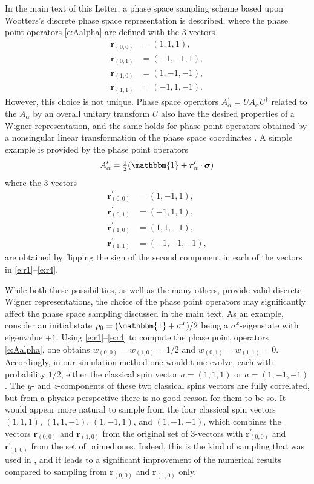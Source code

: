 \documentclass[aps,prl,showpacs,amsmath,amssymb,superscriptaddress,reprint,10pt]{revtex4-1}
\newcommand\id{{\mathbbm{1}}}
\newcommand{\mvec}[1]{\boldsymbol #1}
\begin{document}
In the main text of this Letter, a phase space sampling scheme based upon Wootters's discrete phase space representation is described, where the phase point operators \eqref{e:Aalpha} are defined with the 3-vectors
\begin{subequations}
\begin{align}
\mvec{r}_{(0,0)}&=(1,1,1),\label{e:r1}\\
\mvec{r}_{(0,1)}&=(-1,-1,1),\\
\mvec{r}_{(1,0)}&=(1,-1,-1),\\
\mvec{r}_{(1,1)}&=(-1,1,-1).\label{e:r4}
\end{align}
\end{subequations}
However, this choice is not unique. Phase space operators $A_\alpha^\prime=UA_\alpha U^\dagger$ related to the $A_\alpha$ by an overall unitary transform $U$ also have the desired properties of a Wigner representation, and the same holds for phase point operators obtained by a nonsingular linear transformation of the phase space coordinates \cite{Wootters87}. A simple example is provided by the phase point operators
\begin{equation}
A_\alpha^\prime = \tfrac{1}{2}(\id+\mvec{r}_\alpha^\prime\cdot\mvec{\sigma})
\end{equation}
where the 3-vectors
\begin{subequations}
\begin{align}
\mvec{r}_{(0,0)}^\prime&=(1,-1,1),\\
\mvec{r}_{(0,1)}^\prime&=(-1,1,1),\\
\mvec{r}_{(1,0)}^\prime&=(1,1,-1),\\
\mvec{r}_{(1,1)}^\prime&=(-1,-1,-1),
\end{align}
\end{subequations}
are obtained by flipping the sign of the second component in each of the vectors in \eqref{e:r1}--\eqref{e:r4}.

While both these possibilities, as well as the many others, provide valid discrete Wigner representations, the choice of the phase point operators may significantly affect the phase space sampling discussed in the main text. As an example, consider an initial state $\rho_0 = (\id+\sigma^x)/2$ being a $\sigma^x$-eigenstate with eigenvalue $+1$. Using \eqref{e:r1}--\eqref{e:r4} to compute the phase point operators \eqref{e:Aalpha}, one obtains $w_{(0,0)}=w_{(1,0)}=1/2$ and 
$w_{(0,1)}=w_{(1,1)}=0$. Accordingly, in our simulation method one would time-evolve, each with probability $1/2$, either the classical spin vector $a=(1,1,1)$ or $a=(1,-1,-1)$. The $y$- and $z$-components of these two classical spins vectors are fully correlated, but from a physics perspective there is no good reason for them to be so. It would appear more natural to sample from the four classical spin vectors $(1,1,1)$, $(1,1,-1)$, $(1,-1,1)$, and $(1,-1,-1)$, which combines the vectors $\mvec{r}_{(0,0)}$ and $\mvec{r}_{(1,0)}$ from the original set of 3-vectors with $\mvec{r}_{(0,0)}^\prime$ and $\mvec{r}_{(1,0)}^\prime$ from the set of primed ones. Indeed, this is the kind of sampling that was used in \cite{Schachenmayer_etal15}, and it leads to a significant improvement of the numerical results compared to sampling from $\mvec{r}_{(0,0)}$ and $\mvec{r}_{(1,0)}$ only.
\end{document}
